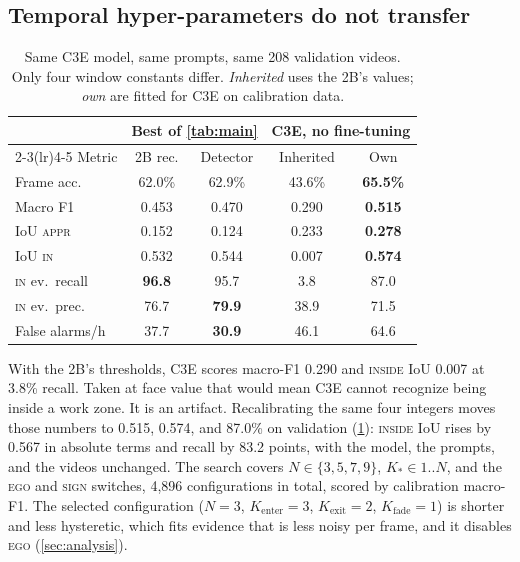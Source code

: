\documentclass[journal]{IEEEtran}
\newcommand{\st}[1]{\textsc{#1}}
\begin{document}
\subsection{Temporal hyper-parameters do not transfer}

\begin{table}[t]
\centering
\caption{Same C3E model, same prompts, same 208 validation videos.  Only four window constants differ.  \emph{Inherited} uses the 2B's values; \emph{own} are fitted for C3E on calibration data.}
\label{tab:worldmodel}
\footnotesize
\begin{tabular}{@{}lcccc@{}}
\toprule
& \multicolumn{2}{c}{Best of \cref{tab:main}} & \multicolumn{2}{c}{C3E, no fine-tuning} \\
\cmidrule(lr){2-3}\cmidrule(lr){4-5}
Metric & 2B rec. & Detector & Inherited & Own \\
\midrule
Frame acc.        & 62.0\% & 62.9\% & 43.6\% & \textbf{65.5\%} \\
Macro F1          & 0.453 & 0.470 & 0.290 & \textbf{0.515} \\
IoU \st{appr}     & 0.152 & 0.124 & 0.233 & \textbf{0.278} \\
IoU \st{in}       & 0.532 & 0.544 & 0.007 & \textbf{0.574} \\
\st{in} ev.\ recall & \textbf{96.8} & 95.7 & 3.8 & 87.0 \\
\st{in} ev.\ prec.\ & 76.7 & \textbf{79.9} & 38.9 & 71.5 \\
False alarms/h    & 37.7 & \textbf{30.9} & 46.1 & 64.6 \\
\bottomrule
\end{tabular}
\end{table}

With the 2B's thresholds, C3E scores macro-F1 0.290 and \st{inside} IoU 0.007 at 3.8\% recall.  Taken at face value that would mean C3E cannot recognize being inside a work zone.  It is an artifact.  Recalibrating the same four integers moves those numbers to 0.515, 0.574, and 87.0\% on validation (\cref{tab:worldmodel}): \st{inside} IoU rises by 0.567 in absolute terms and recall by 83.2 points, with the model, the prompts, and the videos unchanged. The search covers $N \in \{3,5,7,9\}$, $K_\ast \in 1..N$, and the \st{ego} and \st{sign} switches, 4{,}896 configurations in total, scored by calibration macro-F1.  The selected configuration ($N{=}3$, $K_\text{enter}{=}3$, $K_\text{exit}{=}2$, $K_\text{fade}{=}1$) is shorter and less hysteretic, which fits evidence that is less noisy per frame, and it disables \st{ego} (\cref{sec:analysis}).
\end{document}
